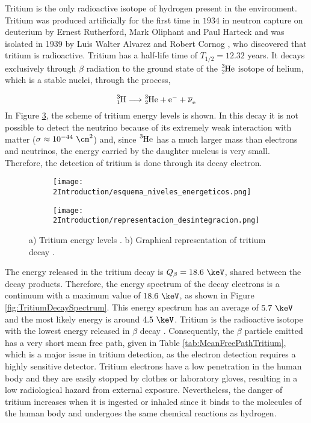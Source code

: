 Tritium is the only radioactive isotope of hydrogen present in the environment. Tritium was produced artificially for the first time in $1934$ in neutron capture on deuterium by Ernest Rutherford, Mark Oliphant and Paul Harteck \cite{TritiumDiscovery} and was isolated in 1939 by Luis Walter Alvarez and Robert Cornog \cite{TritiumIsolate}, who discovered that tritium is radioactive. Tritium has a half-life time of $T_{1/2}= 12.32$ years. It decays exclusively through $\beta$ radiation to the ground state of the $\ce{^{3}_{2}He}$ isotope of helium, which is a stable nuclei, through the process,

\begin{equation}
\ce{^{3}_{1}H} \longrightarrow \ce{^{3}_{2}He}  + \ce{e^-}  + \ce{\overline{\nu}_e}
\label{eq:TritiumDecay}
\end{equation}
In Figure \ref{fig:TritiumDecay}, the scheme of tritium energy levels is shown. In this decay it is not possible to detect the neutrino because of its extremely weak interaction with matter ($\sigma \approx 10^{-44} ~ \cm^2$) \cite{CrossSeccionNeutrino} and, since $\ce{^{3}He}$ has a much larger mass than electrons and neutrinos, the energy carried by the daughter nucleus is very small. Therefore, the detection of tritium is done through its decay electron. 

\begin{figure}
\centering
    \begin{subfigure}[b]{0.85\textwidth}
    \centering
    \texttt{[image: 2Introduction/esquema\_niveles\_energeticos.png]}  
    \caption{\label{subfig:Energy_levels}}
    \end{subfigure}
    \hfill
    \begin{subfigure}[b]{0.7\textwidth}
    \centering
    \texttt{[image: 2Introduction/representacion\_desintegracion.png]}  
    \caption{\label{subfig:GraphicDesintegration}}
    \end{subfigure}
 \caption{a) Tritium energy levels \cite{TritiumDecayEnergyLevels}. b) Graphical representation of tritium decay \cite{TritiumDecayImage}.}
 \label{fig:TritiumDecay}
\end{figure}

The energy released in the tritium decay is $Q_\beta=18.6~\keV$, shared between the decay products. Therefore, the energy spectrum of the decay electrons is a continuum with a maximum value of $18.6~\keV$, as shown in Figure \ref{fig:TritiumDecaySpectrum}. This energy spectrum has an average of $5.7~\keV$ and the most likely energy is around $4.5~\keV$. Tritium is the radioactive isotope with the lowest energy released in $\beta$ decay \cite{TritiumHandling}. Consequently, the $\beta$ particle emitted has a very short mean free path, given in Table \ref{tab:MeanFreePathTritium}, which is a major issue in tritium detection, as the electron detection requires a highly sensitive detector. Tritium electrons have a low penetration in the human body and they are easily stopped by clothes or laboratory gloves, resulting in a low radiological hazard from external exposure. Nevertheless, the danger of tritium increases when it is ingested or inhaled since it binds to the molecules of the human body and undergoes the same chemical reactions as hydrogen.


